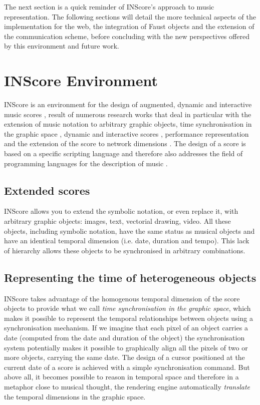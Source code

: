 \documentclass{article}
\begin{document}
The next section is a quick reminder of INScore's approach to music representation. The following sections will detail the more technical aspects of the implementation for the web, the integration of Faust objects and the extension of the communication scheme, before concluding with the new perspectives offered by this environment and future work.


\section{INScore Environment}\label{sec:inscore}

INScore is an environment for the design of augmented, dynamic and interactive music scores \cite{Fober:12a}, result of numerous research works that deal in particular with the extension of music notation to arbitrary graphic objects, time synchronisation in the graphic space \cite{fober:10b}, dynamic and interactive scores \cite{Fober:13b}, performance representation \cite{fober12tr} and the extension of the score to network dimensions \cite{Fober:15b}.
The design of a score is based on a specific scripting language and therefore also addresses the field of programming languages for the description of music \cite{fober:hal-02368958}. 

\subsection{Extended scores}
INScore allows you to extend the symbolic notation, or even replace it, with arbitrary graphic objects: images, text, vectorial drawing, video. All these objects, including symbolic notation, have the same status as musical objects and have an identical temporal dimension (i.e. date, duration and tempo). This lack of hierarchy allows these objects to be synchronised in arbitrary combinations.

\subsection{Representing the time of heterogeneous objects}
INScore takes advantage of the homogenous temporal dimension of the score objects to provide what we call \emph{time synchronisation in the graphic space}, which makes it possible to represent the temporal relationships between objects using a synchronisation mechanism. If we imagine that each pixel of an object carries a date (computed from the date and duration of the object) the synchronisation system potentially makes it possible to graphically align all the pixels of two or more objects, carrying the same date. The design of a cursor positioned at the current date of a score is achieved with a simple synchronisation command. But above all, it becomes possible to reason in temporal space and therefore in a metaphor close to musical thought, the rendering engine automatically \emph{translate} the temporal dimensions in the graphic space.
\end{document}
